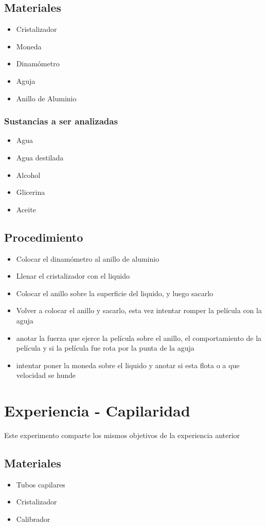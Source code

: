 \documentclass[11pt, letterpaper]{article}
\begin{document}
\subsection{Materiales}
\begin{itemize}
	\item Cristalizador
	\item Moneda
	\item Dinamómetro
	\item Aguja
	\item Anillo de Aluminio
\end{itemize}
\subsubsection{Sustancias a ser analizadas}
\begin{itemize}
	\item Agua
	\item Agua destilada
	\item Alcohol
	\item Glicerina
	\item Aceite
\end{itemize}
\subsection{Procedimiento}
\begin{itemize}
	\item Colocar el dinamómetro al anillo de aluminio
	\item Llenar el cristalizador con el liquido
	\item Colocar el anillo sobre la superficie del liquido, y luego sacarlo
	\item Volver a colocar el anillo y sacarlo, esta vez intentar romper la película con la aguja
	\item anotar la fuerza que ejerce la película sobre el anillo, el comportamiento de la película y si la película fue rota por la punta de la aguja
	\item intentar poner la moneda sobre el liquido y anotar si esta flota o a que velocidad se hunde
\end{itemize}



\section{Experiencia - Capilaridad}
Este experimento comparte los mismos objetivos de la experiencia anterior
\subsection{Materiales}
\begin{itemize}
	\item Tubos capilares
	\item Cristalizador
	\item Calibrador
\end{itemize}
\end{document}
